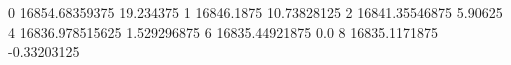 0 16854.68359375 19.234375
1 16846.1875 10.73828125
2 16841.35546875 5.90625
4 16836.978515625 1.529296875
6 16835.44921875 0.0
8 16835.1171875 -0.33203125
